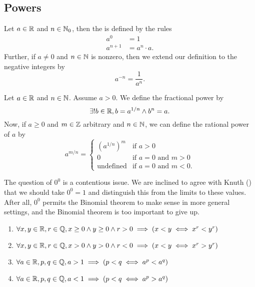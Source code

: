 \subsection{Powers}

\begin{definition}
Let $a\in\mathbb{R}$ and $n\in\mathbb{N}_{0}$, then the  is defined by
the rules
\begin{subequations}
\begin{align}
a^{0} &= 1\\
a^{n+1} &= a^{n}\cdot a.
\end{align}
\end{subequations}
Further, if $a\neq0$ and $n\in\mathbb{N}$ is nonzero, then we extend our
definition to the negative integers by
\begin{equation}
a^{-n} = \frac{1}{a^{n}}.
\end{equation}
\end{definition}

\begin{definition}
Let $a\in\mathbb{R}$ and $n\in\mathbb{N}$. Assume $a>0$. We define the fractional
power by
\begin{equation}
\exists!b\in\mathbb{R},b=a^{1/n}\land b^{n}=a.
\end{equation}
Now, if $a\geq0$ and $m\in\mathbb{Z}$ arbitrary and $n\in\mathbb{N}$, we can define the
rational power of $a$ by
\begin{equation}
a^{m/n} = \begin{cases}
     (a^{1/n})^{m} & \mbox{if } a > 0\\
               0 & \mbox{if } a=0 \mbox{ and } m>0\\
\mbox{undefined} & \mbox{if } a=0\mbox{ and } m < 0.
\end{cases}
\end{equation}
\end{definition}

\begin{remark}
The question of $0^{0}$ is a contentious issue. We are inclined to agree
with Knuth () that we should take $0^{0}=1$ and distinguish this
from the limits to these values. After all, $0^{0}$ permits the Binomial
theorem to make sense in more general settings, and the Binomial theorem
is too important to give up.
\end{remark}

\begin{enumerate}[resume*]
\item $\forall x,y\in\mathbb{R},r\in\mathbb{Q}, x\geq0\land y\geq0\land r>0\implies(x<y\iff x^{r}<y^{r})$
\item $\forall x,y\in\mathbb{R},r\in\mathbb{Q}, x>0\land y>0\land r<0\implies(x<y\iff x^{r}>y^{r})$
\item $\forall a\in\mathbb{R},p,q\in\mathbb{Q}, a>1\implies (p<q\iff a^{p}<a^{q})$
\item $\forall a\in\mathbb{R},p,q\in\mathbb{Q}, a<1\implies (p<q\iff a^{p}>a^{q})$
\end{enumerate}

